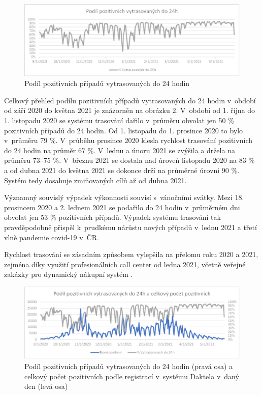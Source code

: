 \begin{figure}[ht]
    \centering
    \includegraphics[width=1\textwidth]{./pic/a.eps}
    \caption{Podíl pozitivních případů vytrasovaných do 24 hodin}
    \label{fig:pozitivni24}
\end{figure}

Celkový přehled podílu pozitivních případů vytrasovaných do 24 hodin v~období od září 2020 do května 2021 je znázorněn na obrázku 2. V~období od 1. října do 1. listopadu 2020 se systému trasování dařilo v~průměru obvolat jen 50 \% pozitivních případů do 24 hodin. Od 1. listopadu do 1. prosince 2020 to bylo v~průměru 79 \%. V~průběhu prosince 2020 klesla rychlost trasování pozitivních do 24 hodin na průměr 67 \%. V~lednu a únoru 2021 se zvýšila a držela na průměru 73--75 \%. V~březnu 2021 se dostala nad úroveň listopadu 2020 na 83 \% a od dubna 2021 do května 2021 se dokonce drží na průměrné úrovni 90 \%. Systém tedy dosahuje zmiňovaných cílů až od dubna 2021.

Významný souvislý výpadek výkonnosti souvisí s~vánočními svátky. Mezi 18. prosincem 2020 a 2. lednem 2021 se podařilo do 24 hodin v~průměrném dni obvolat jen 53 \% pozitivních případů. Výpadek systému trasování tak pravděpodobně přispěl k~prudkému nárůstu nových případů v~lednu 2021 a třetí vlně pandemie covid-19 v~ČR.

Rychlost trasování se zásadním způsobem vylepšila na přelomu roku 2020 a 2021, zejména díky využití profesionálních call center od ledna 2021, včetně veřejné zakázky pro dynamický nákupní systém \cite{tr_hlidac01}.

\begin{figure}[ht]
    \centering
    \includegraphics[width=1\textwidth]{./pic/b.eps}
    \caption{Podíl pozitivních případů vytrasovaných do 24 hodin (pravá osa) a celkový počet pozitivních podle registrací v~systému Daktela v~daný den (levá osa)}
    \label{fig:pozitivni24_2}
\end{figure}

